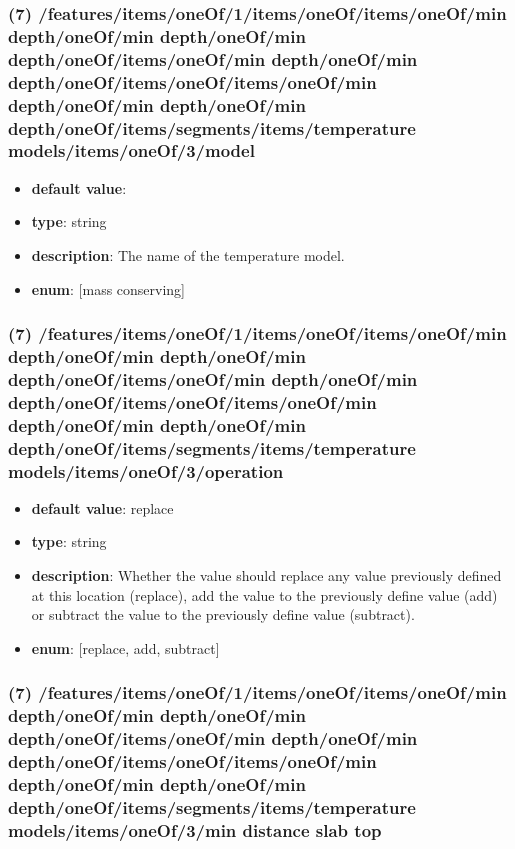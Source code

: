 \subsubsection{(7) /features/items/oneOf/1/items/oneOf/items/oneOf/min depth/oneOf/min depth/oneOf/min depth/oneOf/items/oneOf/min depth/oneOf/min depth/oneOf/items/oneOf/items/oneOf/min depth/oneOf/min depth/oneOf/min depth/oneOf/items/segments/items/temperature models/items/oneOf/3/model}
\begin{itemize}[leftmargin=7em]\item {\bf default value}: 
\item {\bf type}: string
\item {\bf description}: The name of the temperature model.
\item {\bf enum}: [mass conserving]\end{itemize}\subsubsection{(7) /features/items/oneOf/1/items/oneOf/items/oneOf/min depth/oneOf/min depth/oneOf/min depth/oneOf/items/oneOf/min depth/oneOf/min depth/oneOf/items/oneOf/items/oneOf/min depth/oneOf/min depth/oneOf/min depth/oneOf/items/segments/items/temperature models/items/oneOf/3/operation}
\begin{itemize}[leftmargin=7em]\item {\bf default value}: replace
\item {\bf type}: string
\item {\bf description}: Whether the value should replace any value previously defined at this location (replace), add the value to the previously define value (add) or subtract the value to the previously define value (subtract).
\item {\bf enum}: [replace, add, subtract]\end{itemize}\subsubsection{(7) /features/items/oneOf/1/items/oneOf/items/oneOf/min depth/oneOf/min depth/oneOf/min depth/oneOf/items/oneOf/min depth/oneOf/min depth/oneOf/items/oneOf/items/oneOf/min depth/oneOf/min depth/oneOf/min depth/oneOf/items/segments/items/temperature models/items/oneOf/3/min distance slab top}
